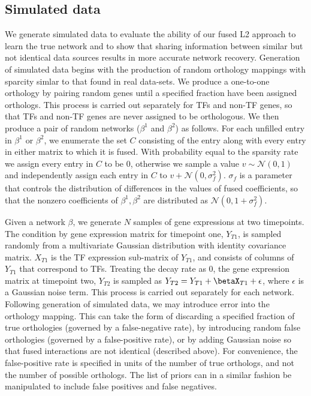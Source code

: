 \documentclass[11pt]{article}
\begin{document}
\subsection{Simulated data}
We generate simulated data to evaluate the ability of our fused L2 approach to learn the true network and to show that sharing information between similar but not identical data sources results in more accurate network recovery. 
Generation of simulated data begins with the production of random orthology mappings with sparcity simlar to that found in real data-sets. 
We produce a one-to-one orthology by pairing random genes until a specified fraction have been assigned orthologs. 
This process is carried out separately for TFs and non-TF genes, so that TFs and non-TF genes are never assigned to be orthologous. 
We then produce a pair of random networks ($\beta^1$ and $\beta^2$) as follows. For each unfilled entry in $\beta^1$ or $\beta^2$, we enumerate the set $C$ consisting of the entry along with every entry in either matrix to which it is fused. 
With probability equal to the sparsity rate we assign every entry in $C$ to be 0, otherwise we sample a value $v \sim \mathcal{N}(0,1)$ and independently assign each entry in $C$ to $v + \mathcal{N}(0, \sigma_f^2)$. $\sigma_f$ is a parameter that controls the distribution of differences in the values of fused coefficients, so that the nonzero coefficients of $\beta^1, \beta^2$ are distributed as $\mathcal{N}(0, 1 + \sigma_f^2)$.

Given a network $\beta$, we generate $N$ samples of gene expressions at two timepoints. 
The condition by gene expression matrix for timepoint one, $Y_{T1}$, is sampled randomly from a multivariate Gaussian distribution with identity covariance matrix. $X_{T1}$ is the TF expression sub-matrix of $Y_{T1}$, and consists of columns of $Y_{T1}$ that correspond to TFs. 
Treating the decay rate as 0, the gene expression matrix at timepoint two, $Y_{T2}$ is sampled as $Y_{T2} = Y_{T1} + \betaX_{T1} + \epsilon$, where $\epsilon$ is a Gaussian noise term. 
This process is carried out separately for each network. 
Following generation of simulated data, we may introduce error into the orthology mapping. 
This can take the form of discarding a specified fraction of true orthologies (governed by a false-negative rate), by introducing random false orthologies (governed by a false-positive rate), or by adding Gaussian noise so that fused interactions are not identical (described above). 
For convenience, the false-positive rate is specified in units of the number of true orthologs, and not the number of possible orthologs. 
The list of priors can in a similar fashion be manipulated to include false positives and false negatives. 
\end{document}
